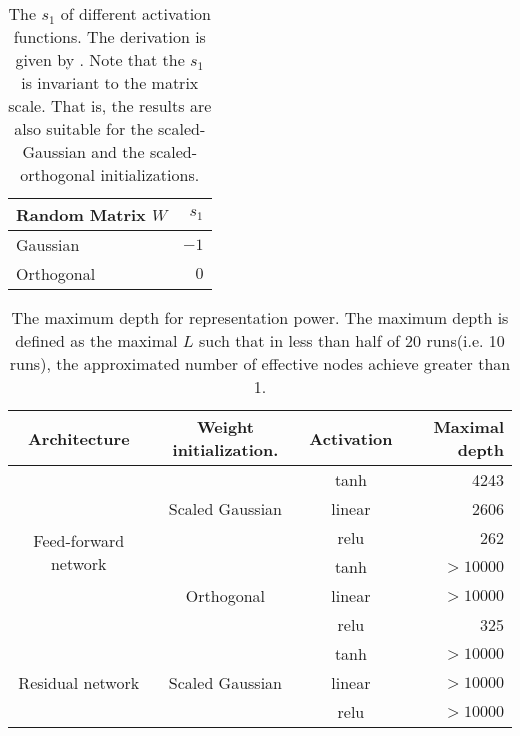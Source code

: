 \begin{table}[h]
    \centering
    \begin{tabular}{|l|r|}
    \hline
        Random Matrix $W$ & $s_1$\\\hline
        Gaussian & $-1$\\\hline
        Orthogonal & $0$\\\hline
    \end{tabular}
    \caption[The $s_1$ of different weight distribution.]
    {The $s_1$ of different activation functions.
    The derivation is given by \cite{mft:spectral}.
    Note that the $s_1$ is invariant to the matrix scale. That is, the results are also
    suitable for the scaled-Gaussian and the scaled-orthogonal initializations.}
    \label{table:s}
\end{table}

\begin{table}[h]
    \centering
    \begin{tabular}{|c|c|c|r|}
    \hline
        Architecture&Weight initialization.&Activation&Maximal depth\\\hline
        \multirow{6}{*}{Feed-forward network} & \multirow{3}{*}{Scaled Gaussian} & tanh & 4243\\\cline{3-4}
         &  & linear & 2606\\\cline{3-4}
         &  & relu   & 262 \\\cline{2-4}
         & \multirow{3}{*}{Orthogonal} & tanh   & $>10000$\\\cline{3-4}
         &  & linear & $>10000$\\\cline{3-4}
         &  & relu   & 325\\\hline
         \multirow{3}{*}{Residual network} & \multirow{3}{*}{Scaled Gaussian} & tanh   & $>10000$\\\cline{3-4}
         &  & linear & $>10000$\\\cline{3-4}
         &  & relu   & $>10000$\\\hline
    \end{tabular}
    \caption[The maximum depth for different architectures and initializations]
    {The maximum depth for representation power. The maximum depth
    is defined as the maximal $L$ such that in less than half of 20
    runs(i.e. 10 runs), the approximated number of effective nodes achieve greater than 1.}
    \label{dead_table}
\end{table}

